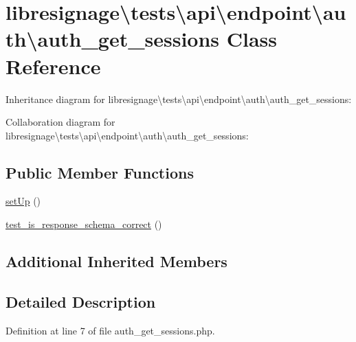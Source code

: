 \hypertarget{classlibresignage_1_1tests_1_1api_1_1endpoint_1_1auth_1_1auth__get__sessions}{}\section{libresignage\textbackslash{}tests\textbackslash{}api\textbackslash{}endpoint\textbackslash{}auth\textbackslash{}auth\+\_\+get\+\_\+sessions Class Reference}
\label{classlibresignage_1_1tests_1_1api_1_1endpoint_1_1auth_1_1auth__get__sessions}


Inheritance diagram for libresignage\textbackslash{}tests\textbackslash{}api\textbackslash{}endpoint\textbackslash{}auth\textbackslash{}auth\+\_\+get\+\_\+sessions\+:


Collaboration diagram for libresignage\textbackslash{}tests\textbackslash{}api\textbackslash{}endpoint\textbackslash{}auth\textbackslash{}auth\+\_\+get\+\_\+sessions\+:
\subsection*{Public Member Functions}
\begin{DoxyCompactItemize}
\item 
\hyperlink{classlibresignage_1_1tests_1_1api_1_1endpoint_1_1auth_1_1auth__get__sessions_a368bde890a438e7f4714e9badb460488}{set\+Up} ()
\item 
\hyperlink{classlibresignage_1_1tests_1_1api_1_1endpoint_1_1auth_1_1auth__get__sessions_a187315c0209806c2c9dafa6880b859ff}{test\+\_\+is\+\_\+response\+\_\+schema\+\_\+correct} ()
\end{DoxyCompactItemize}
\subsection*{Additional Inherited Members}


\subsection{Detailed Description}


Definition at line 7 of file auth\+\_\+get\+\_\+sessions.\+php.



